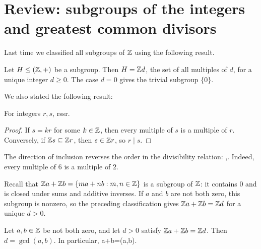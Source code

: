 \documentclass[reqno,11pt]{amsart}
\begin{document}
\makelecturetitle

\section{Review: subgroups of the integers and greatest common divisors}

Last time we classified all subgroups of $\mathbb{Z}$ using the following result.

\begin{theorem}
Let $H\leq(\mathbb{Z},+)$ be a subgroup. Then $H=\mathbb{Z} d$, the set of all multiples
of $d$, for a unique integer $d\geq0$. The case $d=0$ gives the trivial
subgroup $\{0\}$.
\end{theorem}

We also stated the following result:

\begin{lemma}\label{lem:divisibility}
	For integers $r,s$,
	\be
	r\mid s\quad\Longleftrightarrow\quad\Z s\subseteq\Z r.
	\ee
\end{lemma}

\begin{proof}
	If $s=kr$ for some $k\in\mathbb{Z}$, then every multiple of $s$ is a multiple
	of $r$. Conversely, if $\mathbb{Z} s\subseteq\mathbb{Z} r$, then $s\in\mathbb{Z} r$, so $r\mid s$.
\end{proof}

\begin{example}
	The direction of inclusion reverses the order in the divisibility relation:
	,\Z{}\Z.
	\ee
	Indeed, every multiple of $6$ is a multiple of $2$.
\end{example}

Recall that $\mathbb{Z} a+\mathbb{Z} b=\{ma+nb:m,n\in\mathbb{Z}\}$ is a subgroup of $\mathbb{Z}$:
it contains $0$ and is closed under sums and additive inverses.
If $a$ and $b$ are not both zero, this subgroup is nonzero, so the preceding
classification gives $\mathbb{Z} a+\mathbb{Z} b=\mathbb{Z} d$ for a unique $d>0$.

\begin{proposition}
	Let $a,b\in\mathbb{Z}$ be not both zero, and let $d>0$ satisfy
	$\mathbb{Z} a+\mathbb{Z} b=\mathbb{Z} d$. Then $d=\gcd(a,b)$. In particular,
	\be
	\Z a+\Z b=\Z\gcd(a,b).
	\ee
\end{proposition}
\end{document}
